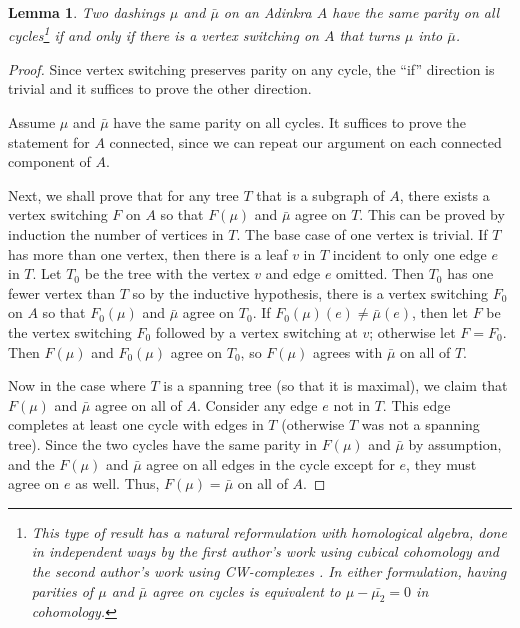 \documentclass[12pt,twoside,singlespace]{article}
\numberwithin{equation}{section}
\newtheorem{lem}[equation]{Lemma}
\theoremstyle{definition}
\begin{document}
\begin{lem}
\label{lem:cycles-switching-class}
Two dashings $\mu$ and $\bar{\mu}$ on an Adinkra $A$ have the same parity on all cycles\footnote{This type of result has a natural reformulation with homological algebra, done in independent ways by the first author's work using cubical cohomology \cite{dil:cohomology} and the second author's work using CW-complexes \cite{zhang:adinkras}. In either formulation, having parities of $\mu$ and $\bar{\mu}$ agree on cycles is equivalent to $\mu - \bar{\mu_2} = 0$ in cohomology.} if and only if there is a vertex switching on $A$ that turns $\mu$ into $\bar{\mu}$.
\end{lem}

\begin{proof}
Since vertex switching preserves parity on any cycle, the ``if'' direction is trivial and it suffices to prove the other direction.

Assume $\mu$ and $\bar{\mu}$ have the same parity on all cycles. It suffices to prove the statement for $A$ connected, since we can repeat our argument on each connected component of $A$.

Next, we shall prove that for any tree $T$ that is a subgraph of $A$, there exists a vertex switching $F$ on $A$ so that $F(\mu)$ and $\bar{\mu}$ agree on $T$.  This can be proved by induction the number of vertices in $T$.  The base case of one vertex is trivial.  If $T$ has more than one vertex, then there is a leaf $v$ in $T$ incident to only one edge $e$ in $T$.  Let $T_0$ be the tree with the vertex $v$ and edge $e$ omitted.  Then $T_0$ has one fewer vertex than $T$ so by the inductive hypothesis, there is a vertex switching $F_0$ on $A$ so that $F_0(\mu)$ and $\bar{\mu}$ agree on $T_0$.  If $F_0(\mu)(e)\not=\bar{\mu}(e)$, then let $F$ be the vertex switching $F_0$ followed by a vertex switching at $v$; otherwise let $F=F_0$.  Then $F(\mu)$ and $F_0(\mu)$ agree on $T_0$, so $F(\mu)$ agrees with $\bar{\mu}$ on all of $T$.

Now in the case where $T$ is a spanning tree (so that it is maximal), we claim that $F(\mu)$ and $\bar{\mu}$ agree on all of $A$.  Consider any edge $e$ not in $T$. This edge completes at least one cycle with edges in $T$ (otherwise $T$ was not a spanning tree). Since the two cycles have the same parity in $F(\mu)$ and $\bar{\mu}$ by assumption, and the $F(\mu)$ and $\bar{\mu}$ agree on all edges in the cycle except for $e$, they must agree on $e$ as well.  Thus, $F(\mu)=\bar{\mu}$ on all of $A$.
\end{proof}
\end{document}
